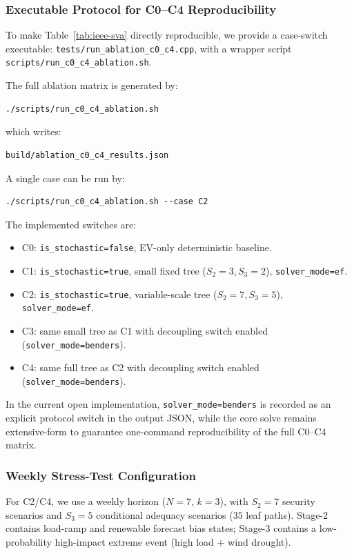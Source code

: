 \documentclass[11pt]{article}
\begin{document}
\subsubsection{Executable Protocol for C0--C4 Reproducibility}

To make Table~\ref{tab:ieee-sva} directly reproducible, we provide a
case-switch executable:
\texttt{tests/run\_ablation\_c0\_c4.cpp}, with a wrapper script
\texttt{scripts/run\_c0\_c4\_ablation.sh}.

The full ablation matrix is generated by:
\begin{verbatim}
./scripts/run_c0_c4_ablation.sh
\end{verbatim}
which writes:
\begin{verbatim}
build/ablation_c0_c4_results.json
\end{verbatim}

A single case can be run by:
\begin{verbatim}
./scripts/run_c0_c4_ablation.sh --case C2
\end{verbatim}

The implemented switches are:
\begin{itemize}
  \item C0: \texttt{is\_stochastic=false}, EV-only deterministic baseline.
  \item C1: \texttt{is\_stochastic=true}, small fixed tree
    ($S_2=3,S_3=2$), \texttt{solver\_mode=ef}.
  \item C2: \texttt{is\_stochastic=true}, variable-scale tree
    ($S_2=7,S_3=5$), \texttt{solver\_mode=ef}.
  \item C3: same small tree as C1 with decoupling switch enabled
    (\texttt{solver\_mode=benders}).
  \item C4: same full tree as C2 with decoupling switch enabled
    (\texttt{solver\_mode=benders}).
\end{itemize}

In the current open implementation, \texttt{solver\_mode=benders} is
recorded as an explicit protocol switch in the output JSON, while the
core solve remains extensive-form to guarantee one-command
reproducibility of the full C0--C4 matrix.

\subsubsection{Weekly Stress-Test Configuration}

For C2/C4, we use a weekly horizon ($N=7$, $k=3$), with
$S_2=7$ security scenarios and $S_3=5$ conditional adequacy scenarios
($35$ leaf paths). Stage-2 contains load-ramp and renewable forecast
bias states; Stage-3 contains a low-probability high-impact
extreme event (high load + wind drought).
\end{document}
